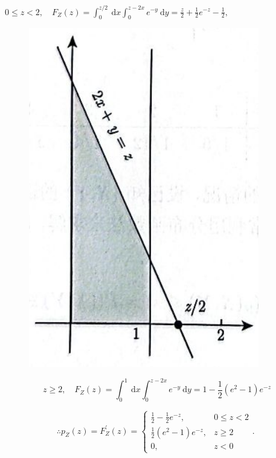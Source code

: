 \documentclass{beamer}
\begin{document}
	\begin{frame}
		$0 \leqslant z<2, \quad F_{Z}(z)=\int_{0}^{z / 2} \mathrm{~d} x \int_{0}^{z-2 x} e^{-y} \mathrm{~d} y=\frac{z}{2}+\frac{1}{2} e^{-z}-\frac{1}{2},$
		
		\begin{figure}
			\centering
			\includegraphics[scale = 0.2]{figures/figure3-54.png}
		\end{figure}
		$$
		z \geqslant 2, \quad F_{Z}(z)=\int_{0}^{1} \mathrm{~d} x \int_{0}^{z-2 x} e^{-y} \mathrm{~d} y=1-\frac{1}{2}\left(e^{2}-1\right) e^{-z}
		$$
		
		$$
		\therefore p_{Z}(z)=F_{Z}^{\prime}(z)=\left\{\begin{array}{ll}
			\frac{1}{2}-\frac{1}{2} e^{-z}, & 0 \leqslant z<2 \\
			\frac{1}{2}\left(e^{2}-1\right) e^{-z}, & z \geqslant 2 \\
			0, & z<0
		\end{array}\right. \text {. }
		$$
	\end{frame}
	
\end{document}
